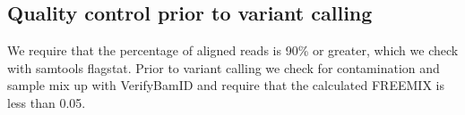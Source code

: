 \subsection{Quality control prior to variant calling}
We require that the percentage of aligned reads is 90\% or greater, which we check with samtools flagstat. Prior to variant calling we check for contamination and sample mix up with VerifyBamID and require that the calculated FREEMIX is less than 0.05.

